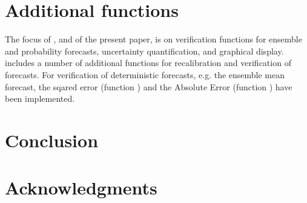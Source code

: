 \documentclass[article]{jss}
\begin{document}
\section{Additional functions}

The focus of , and of the present paper, is on verification functions for ensemble and probability forecasts, uncertainty quantification, and graphical display.
 includes a number of additional functions for recalibration and verification of forecasts.
For verification of deterministic forecasts, e.g. the ensemble mean forecast, the sqared error (function ) and the Absolute Error (function ) have been implemented.





\section{Conclusion}

\section*{Acknowledgments}



\end{document}
